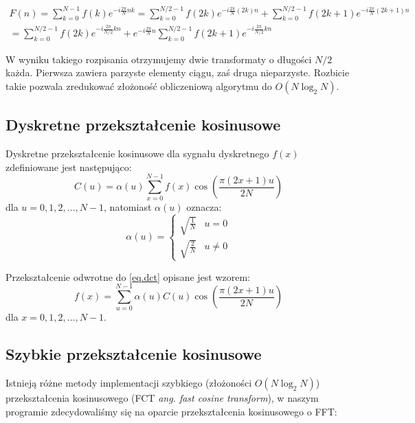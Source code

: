 \documentclass{classrep}
\begin{document}
\begin{equation}
  \label{wzor.fft}
  \begin{array}{c}
    F(n) = \displaystyle \sum_{k=0}^{N-1} f(k) e^{-i\frac{2\pi}{N}nk} = \displaystyle\sum_{k = 0}^{N/2 - 1} f(2k) e^{-i\frac{2\pi}{N}(2k)n} + \displaystyle\sum_{k = 0}^{N/2 - 1} f(2k + 1) e^{-i\frac{2\pi}{N}(2k + 1)n} \\
    = \displaystyle\sum_{k = 0}^{N/2 - 1} f(2k) e^{-i\frac{2\pi}{N/2}kn} + e^{-i\frac{2\pi}{N}n}\displaystyle\sum_{k = 0}^{N/2 - 1} f(2k + 1) e^{-i\frac{2\pi}{N/2}kn}
  \end{array}
\end{equation}

W wyniku takiego rozpisania otrzymujemy dwie transformaty o długości $N / 2$ każda. Pierwsza zawiera parzyste elementy ciągu, zaś druga \ppauza nieparzyste. Rozbicie takie pozwala zredukować złożoność obliczeniową algorytmu do $O(N\log_2 N)$.

\subsection{Dyskretne przekształcenie kosinusowe}
Dyskretne przekształcenie kosinusowe dla sygnału dyskretnego $f(x)$ zdefiniowane jest następująco:
\begin{equation}
  \label{eq.dct}
  C(u) = \alpha (u) \displaystyle \sum_{x = 0}^{N - 1} f(x) \cos \left(\frac{\pi(2x + 1)u}{2N}\right)
\end{equation}
dla $u = 0, 1, 2, \ldots, N - 1$, natomiast $\alpha(u)$ oznacza:
\begin{equation}
  \label{eq.dctalpha}
  \alpha(u) = \begin{cases} \sqrt{\frac{1}{N}} & \text{$u = 0$} \\
			    \sqrt{\frac{2}{N}} & \text{$u \neq 0$}
              \end{cases}
\end{equation}

Przekształcenie odwrotne do \ref{eq.dct} opisane jest wzorem:
\begin{equation}
  \label{eq.idct}
  f(x) = \displaystyle \sum_{u = 0}^{N - 1} \alpha(u) C(u) \cos \left(\frac{\pi(2x + 1)u}{2N}\right)
\end{equation}
dla $x = 0, 1, 2, \ldots, N - 1$.

\subsection{Szybkie przekształcenie kosinusowe}
Istnieją różne metody implementacji szybkiego (złożoności $O(N\log_2 N)$) przekształcenia kosinusowego (FCT \ppauza \emph{ang. fast cosine transform}), w naszym programie zdecydowaliśmy się na oparcie przekształcenia kosinusowego o FFT:
\end{document}
